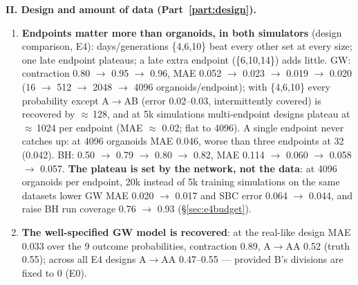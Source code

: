 \documentclass[10pt,a4paper]{article}
\begin{document}
\textbf{II. Design and amount of data (Part~\ref{part:design}).}
\begin{enumerate}[resume,leftmargin=1.4em]
\item \textbf{Endpoints matter more than organoids, in both simulators} (design comparison, E4): days/generations \{4,6,10\} beat every other set at every size; one late endpoint plateaus; a late extra endpoint (\{6,10,14\}) adds little. GW: contraction 0.80 $\to$ 0.95 $\to$ 0.96, MAE 0.052 $\to$ 0.023 $\to$ 0.019 $\to$ 0.020 (16 $\to$ 512 $\to$ 2048 $\to$ 4096 organoids/endpoint); with \{4,6,10\} every probability except A$\to$AB (error 0.02--0.03, intermittently covered) is recovered by $\approx$\,128, and at 5k simulations multi-endpoint designs plateau at $\approx$\,1024 per endpoint (MAE $\approx$ 0.02; flat to 4096). A single endpoint never catches up: at 4096 organoids MAE 0.046, worse than three endpoints at 32 (0.042). BH: 0.50 $\to$ 0.79 $\to$ 0.80 $\to$ 0.82, MAE 0.114 $\to$ 0.060 $\to$ 0.058 $\to$ 0.057. \textbf{The plateau is set by the network, not the data}: at 4096 organoids per endpoint, 20k instead of 5k training simulations on the same datasets lower GW MAE 0.020 $\to$ 0.017 and SBC error 0.064 $\to$ 0.044, and raise BH run coverage 0.76 $\to$ 0.93 (\S\ref{sec:e4budget}).
\item \textbf{The well-specified GW model is recovered}: at the real-like design MAE 0.033 over the 9 outcome probabilities, contraction 0.89, A$\to$AA 0.52 (truth 0.55); across all E4 designs A$\to$AA 0.47--0.55 --- provided B's divisions are fixed to 0 (E0).
\end{enumerate}
\end{document}
